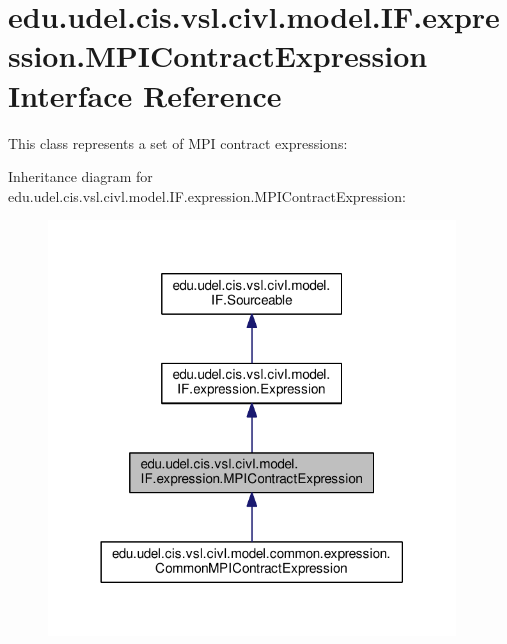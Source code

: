 \hypertarget{interfaceedu_1_1udel_1_1cis_1_1vsl_1_1civl_1_1model_1_1IF_1_1expression_1_1MPIContractExpression}{}\section{edu.\+udel.\+cis.\+vsl.\+civl.\+model.\+I\+F.\+expression.\+M\+P\+I\+Contract\+Expression Interface Reference}
\label{interfaceedu_1_1udel_1_1cis_1_1vsl_1_1civl_1_1model_1_1IF_1_1expression_1_1MPIContractExpression}


This class represents a set of M\+P\+I contract expressions\+:  




Inheritance diagram for edu.\+udel.\+cis.\+vsl.\+civl.\+model.\+I\+F.\+expression.\+M\+P\+I\+Contract\+Expression\+:
\nopagebreak
\begin{figure}[H]
\begin{center}
\leavevmode
\includegraphics[width=306pt]{interfaceedu_1_1udel_1_1cis_1_1vsl_1_1civl_1_1model_1_1IF_1_1expression_1_1MPIContractExpression__inherit__graph}
\end{center}
\end{figure}


